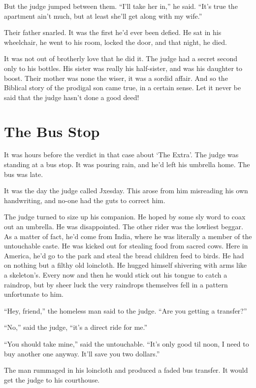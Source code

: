 \documentclass[oneside]{book}
\begin{document}
But the judge jumped between them.
``I'll take her in,'' he said.  ``It's true the apartment
ain't much, but at least she'll get along with my wife.''

Their father snarled.  It was the first he'd ever been
defied.  He sat in his wheelchair, he went to his room, locked
the door, and that night, he died.

It was not out of brotherly love that he did it.
The judge had a secret second only to his bottles.
His sister was really his half-sister, and was his
daughter to boost.  Their mother was none the wiser,
it was a sordid affair.  And so the Biblical story
of the prodigal son came true, in a certain sense.
Let it never be said that the judge hasn't done a good deed!

\chapter{The Bus Stop}


It was hours before the verdict in that case about `The Extra'.
The judge was standing at a bus stop.
It was pouring rain, and he'd left his umbrella home.
The bus was late.

It was the day the judge called Jxesday.  This arose from
him misreading his own handwriting, and no-one had the
guts to correct him.

The judge turned to size up his companion.
He hoped by some sly word to coax out an umbrella.
He was disappointed.
The other rider was the lowliest beggar.
As a matter of fact, he'd come from India, where he was literally
a member of the untouchable caste.  He was kicked out for stealing
food from sacred cows.  Here in America, he'd go to the park and
steal the bread children feed to birds.
He had on nothing but a filthy  old loincloth.  He hugged himself
shivering with arms like a skeleton's.
Every now and then he would stick out his tongue to catch a raindrop,
but by sheer luck the very raindrops themselves fell in a pattern
unfortunate to him.

``Hey, friend,'' the homeless man said to the judge.
``Are you getting a transfer?''

``No,'' said the judge, ``it's a direct ride for me.''

``You should take mine,'' said the untouchable.
``It's only good til noon, I need to buy another one anyway.
It'll save you two dollars.''

The man rummaged in his loincloth and produced a faded bus transfer.
It would get the judge to his courthouse.
\end{document}
